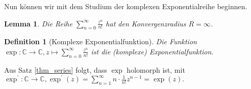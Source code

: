\documentclass[a4paper,12pt]{article}
\theoremstyle{newthm}
\newtheorem{lem}[thm]{Lemma}
\theoremstyle{newdef}
\newtheorem{defn}[thm]{Definition}
\theoremstyle{newrem}
\newcommand{\C}{\mathbb{C}}
\begin{document}
		Nun können wir mit dem Studium der komplexen Exponentialreihe beginnen.
		
		\begin{lem}
			Die Reihe $ \sum\limits_{n=0}^\infty \frac{z^n}{n!} $ hat den Konvergenzradius $ R = \infty $.
		\end{lem}
		
		\begin{defn}[Komplexe Exponentialfunktion]
			Die Funktion $ \exp: \C \to \C, z \mapsto \sum\limits_{n=0}^\infty \frac{z^n}{n!} $ ist die \emph{(komplexe) Exponentialfunktion}.
		\end{defn}
		
		Aus Satz \ref{thm_series} folgt, dass $\exp$ holomorph ist, mit $ \exp^\prime:\C \to \C, \exp^\prime(z) = \sum\limits_{n=1}^\infty n \cdot \frac{1}{n!} z^{n-1} = \exp(z). $\\
		
\end{document}
